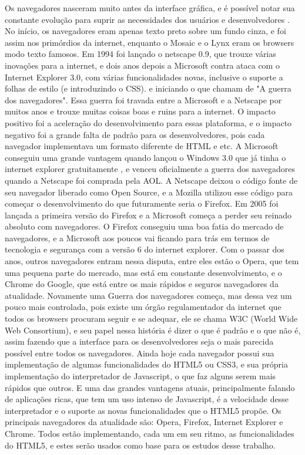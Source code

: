 Os navegadores nasceram muito antes da interface gráfica,
e é possível notar sua constante evolução para suprir as necessidades
dos usuários e desenvolvedores \cite{robbins2006web}. No início, os
navegadores eram apenas texto preto sobre um fundo cinza, e foi assim
nos primórdios da internet, enquanto o Mosaic e o Lynx eram os
browsers modo texto famosos. Em 1994 foi lançado o netscape 0.9, que
trouxe várias inovações para a internet, e dois anos depois a
Microsoft contra ataca com o Internet Explorer 3.0, com várias
funcionalidades novas, inclusive o suporte a folhas de estilo (e
introduzindo o CSS). e iniciando o que chamam de "A guerra dos
navegadores". Essa guerra foi travada entre a Microsoft e a Netscape
por muitos anos e trouxe muitas coisas boas e ruins para a internet. O
impacto positivo foi a aceleração do desenvolvimento para essas
plataforma, e o impacto negativo foi a grande falta de padrão para os
desenvolvedores, pois cada navegador implementava um formato diferente
de HTML e etc. A Microsoft conseguiu uma grande vantagem quando lançou
o Windows 3.0 que já tinha o internet explorer gratuitamente
\cite{asleson2006foundations}, e venceu oficialmente a guerra dos navegadores quando a
Netscape foi comprada pela AOL. A Netscape deixou o código fonte
de seu navegador liberado como Open Source, e a Mozilla utilizou esse
código para começar o desenvolvimento do que futuramente seria o
Firefox.
Em 2005 foi lançada a primeira versão do Firefox e a Microsoft começa
a perder seu reinado absoluto com navegadores. O Firefox conseguiu uma
boa fatia do mercado de navegadores, e a Microsoft aos poucos vai
ficando para trás em termos de tecnologia e segurança com a versão 6
do internet explorer.
Com o passar dos anos, outros navegadores entram nessa disputa, entre
eles estão o Opera, que tem uma pequena parte do mercado, mas está em
constante desenvolvimento, e o Chrome do Google, que está entre os
mais rápidos e seguros navegadores da atualidade.
Novamente uma Guerra dos navegadores começa, mas dessa vez um pouco
mais controlada, pois existe um órgão regulamentador da internet que
todos os browsers procuram seguir e se adequar, ele se chama W3C
(World Wide Web Consortium), e seu papel nessa história é dizer o que
é padrão e o que não é, assim fazendo que a interface para os
desenvolvedores seja o mais parecida possível entre todos os
navegadores.
Ainda hoje cada navegador possui sua implementação de algumas
funcionalidades do HTML5 ou CSS3, e sua própria implementação do
interpretador de Javascript, o que faz alguns serem mais rápidos que
outros. E uma das grandes vantagens atuais, principalmente falando de
aplicações ricas, que tem um uso intenso de Javascript, é a velocidade
desse interpretador e o suporte as novas funcionalidades que o HTML5
propõe.
Os principais navegadores da atualidade são: Opera, Firefox, Internet
Explorer e Chrome. Todos estão implementando, cada um em seu ritmo, as
funcionalidades do HTML5, e estes serão usados como base para os
estudos desse trabalho.

